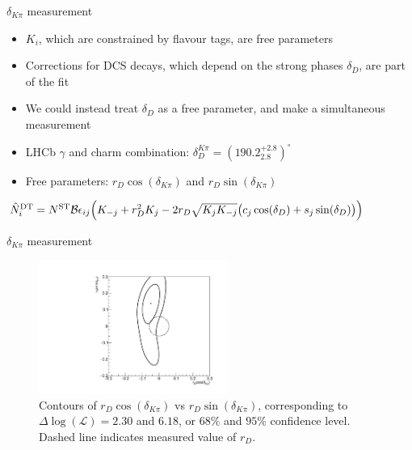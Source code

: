 \documentclass{beamer}
\begin{document}
\begin{frame}{$\delta_{K\pi}$ measurement}
  \begin{itemize}
    \setlength\itemsep{1.0em}
    \item{$K_i$, which are constrained by flavour tags, are free parameters}
    \item{Corrections for DCS decays, which depend on the strong phases $\delta_D$, are part of the fit}
    \item{We could instead treat $\delta_D$ as a free parameter, and make a simultaneous measurement}
    \item{LHCb $\gamma$ and charm combination: $\delta_D^{K\pi} = (190.2^{+2.8}_{2.8})^\circ$}
    \item{Free parameters: $r_D\cos(\delta_{K\pi})$ and $r_D\sin(\delta_{K\pi})$}
  \end{itemize}
  \vspace{0.5cm}
  \begin{center}
    $\hat{N}^{\rm DT}_i = N^{\rm ST}\mathcal{B}\epsilon_{ij}\Big(K_{-j} + r_D^2K_j - 2r_D\sqrt{K_jK_{-j}}\big(c_j\cos(\delta_D) + s_j\sin(\delta_D)\big)\Big)$
  \end{center}
\end{frame}

\begin{frame}{$\delta_{K\pi}$ measurement}
  \begin{figure}
    \includegraphics[width=0.55\textwidth]{Plots/Contour_DeltaKpi.pdf}
    \caption{Contours of $r_D\cos(\delta_{K\pi})$ vs $r_D\sin(\delta_{K\pi})$, corresponding to $\Delta\log(\mathcal{L}) = 2.30$ and $6.18$, or $68\%$ and $95\%$ confidence level. Dashed line indicates measured value of $r_D$.}
  \end{figure}
\end{frame}
\end{document}
